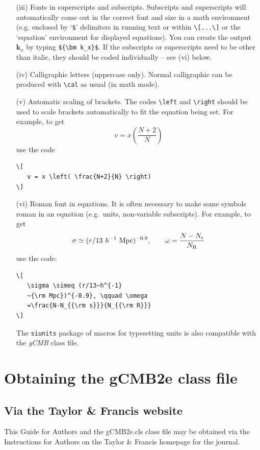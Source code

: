 \documentclass{gCMB2e}
\begin{document}
\begin{enumerate}
\item[(iii)] Fonts in superscripts and subscripts. Subscripts and superscripts will automatically come  out in the correct font
and size in a math environment (e.g. enclosed by `\verb"$"'
delimiters in running text or within \verb"\[...\]" or the
`equation' environment for displayed equations). You can create
the output ${\bm k_x}$ by typing \verb"${\bm k_x}$". If the
subscripts or superscripts need to be other than italic, they
should be coded individually -- see (vi) below.

\item[(iv)] Calligraphic letters (uppercase only).
%
%
Normal calligraphic can be produced with \verb"\cal" as usual (in
math mode).

\item[(v)] Automatic scaling of brackets. The codes \verb"\left" and
\verb"\right" should  be used to scale brackets automatically to
fit the equation being set. For example, to get
\[
   v = x \left( \frac{N+2}{N} \right)
\]
use the code
%
\begin{verbatim}
\[
   v = x \left( \frac{N+2}{N} \right)
\]
\end{verbatim}

\item[(vi)] Roman font in equations. It is often necessary to make some
symbols roman in an equation (e.g.\ units, non-variable
subscripts). For example, to get
\[
   \sigma \simeq (r/13~h^{-1}~{\rm Mpc})^{-0.9},
   \qquad \omega = \frac{N-N_{\rm s}}{N_{\rm R}}
\]
\noindent use the code:
%
\begin{verbatim}
\[
   \sigma \simeq (r/13~h^{-1}
   ~{\rm Mpc})^{-0.9}, \qquad \omega
   =\frac{N-N_{{\rm s}}}{N_{{\rm R}}}
\]
\end{verbatim}
The \texttt{siunits} package of macros for typesetting units is also compatible with the \textit{gCMB} class file.
\end{enumerate}


\section{Obtaining the gCMB2e class file}\label{FTP}

\subsection{Via the Taylor \& Francis website}

\noindent This Guide for Authors and the gCMB2e.cls class file may be obtained via the Instructions for Authors
on the Taylor \& Francis homepage for the journal.
\end{document}
